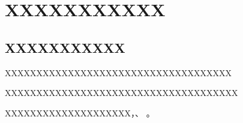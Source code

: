 \documentclass[../article.tex]{subfiles} %
\begin{document}
\section{XXXXXXXXXXX}
\subsection{XXXXXXXXXXX}

XXXXXXXXXXXXXXXXXXXXXXXXXXXXXXXXXXXX

XXXXXXXXXXXXXXXXXXXXXXXXXXXXXXXXXXXXX

XXXXXXXXXXXXXXXXXXXX\cite{soft-nms}，\cite{hog}、\cite{vcnn} \cite{solov2}。
\end{document}
